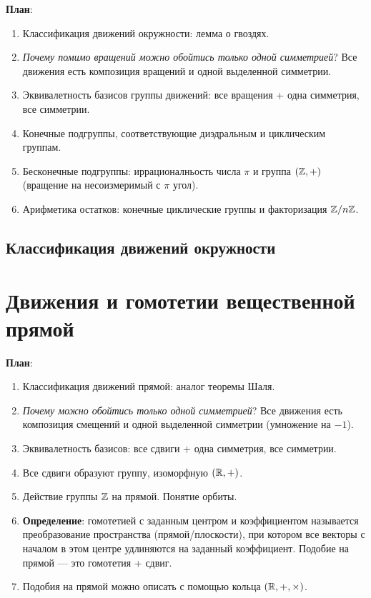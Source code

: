 \textbf{План}:

\begin{enumerate}
\item Классификация движений окружности: лемма о гвоздях.
\item \textit{Почему помимо вращений можно обойтись только одной симметрией}? Все движения есть композиция вращений и одной выделенной симметрии.
\item Эквивалетность базисов группы движений: все вращения + одна симметрия, все симметрии.
\item Конечные подгруппы, соответствующие диэдральным и циклическим группам.
\item Бесконечные подгруппы: иррационалньость числа $\pi$ и группа $(\mathbb Z,+)$ (вращение на несоизмеримый с $\pi$ угол).
\item Арифметика остатков: конечные циклические группы и факторизация $\mathbb Z/n\mathbb Z$.
\end{enumerate}


\subsection{Классификация движений окружности}







\section{Движения и гомотетии вещественной прямой}



\textbf{План}:
\begin{enumerate}
\item Классификация движений прямой: аналог теоремы Шаля.
\item \textit{Почему можно обойтись только одной симметрией}? Все движения есть композиция смещений и одной выделенной симметрии (умножение на $-1$).
\item Эквивалетность базисов: все сдвиги + одна симметрия, все симметрии.
\item Все сдвиги образуют группу, изоморфную $(\mathbb R,+)$.
\item Действие группы $\mathbb Z$ на прямой. Понятие орбиты.
\item \textbf{Определение}: гомотетией с заданным центром и коэффициентом называется преобразование пространства (прямой/плоскости), при котором все векторы с началом в этом центре удлиняются на заданный коэффициент. Подобие на прямой --- это гомотетия + сдвиг.
\item Подобия на прямой можно описать с помощью кольца $(\mathbb R,+,\times)$.
\end{enumerate}







